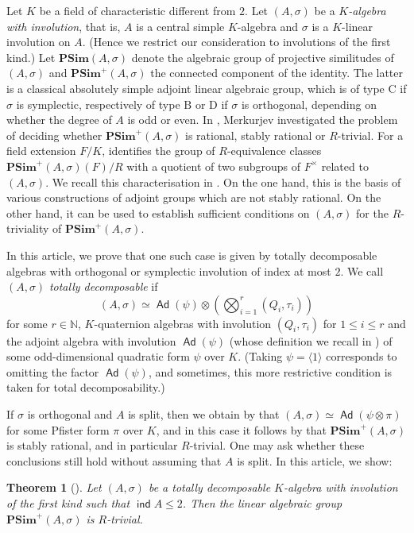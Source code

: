 \documentclass[twoside,11pt]{amsart}
\numberwithin{equation}{section}
\newtheorem*{main}{Theorem}
\theoremstyle{definition}
\newcommand\ind{\operatorname{\mathsf{ind}}}
\newcommand{\mg}[1]{{#1}^{\times}}
\newcommand{\s}{\sigma}
\newcommand{\nat}{\mathbb{N}}
\newcommand{\la}{\langle}
\newcommand{\ra}{\rangle}
\renewcommand{\leq}{\leqslant}
\newcommand\Ad{\operatorname{\mathsf{Ad}}}
\newcommand{\dyn}[1]{\mathrm{#1}}
\begin{document}
Let $K$ be a field of characteristic different from $2$.
Let $(A,\s)$ be a \emph{$K$-algebra with involution}, that is, $A$ is a central simple $K$-algebra and $\s$ is a $K$-linear involution on $A$. (Hence we restrict our consideration to involutions of the first kind.)
Let $\mathbf{PSim}(A,\s)$ denote the algebraic group of  projective similitudes of $(A,\s)$ and $\mathbf{PSim}^+(A,\s)$ the connected component of the identity.
The latter is a classical absolutely simple adjoint linear algebraic group, which is of type $\dyn{C}$ if $\s$ is symplectic, respectively of type $\dyn{B}$ or $\dyn{D}$ if $\s$ is orthogonal, depending on whether the degree of $A$ is odd or even.
In \cite{Mer96}, Merkurjev investigated the problem of deciding whether $\mathbf{PSim}^+(A,\s)$ is rational, stably rational or $R$-trivial. 
For a field extension $F/K$, \cite[Theorem 1]{Mer96} identifies the group of $R$-equivalence classes $\mathbf{PSim}^+(A,\s)(F)/R$ with a quotient of two subgroups of $\mg{F}$ related to $(A,\s)$.
We recall this characterisation in .
On the one hand, this is the basis of various constructions of adjoint groups which are not stably rational.
On the other hand, it can be used to establish sufficient conditions on $(A,\s)$ for the $R$-triviality of $\mathbf{PSim}^+(A,\s)$.

In this article, we prove that one such case is given by totally decomposable algebras with orthogonal or symplectic involution of index at most $2$.
We call $(A,\s)$ \emph{totally decomposable} 
if $$(A,\s)\simeq \Ad(\psi)\otimes\left(\bigotimes_{i=1}^r (Q_i,\tau_i)\right)$$
for some $r\in\nat$, $K$-quaternion algebras with involution $(Q_i,\tau_i)$ for $1\leq i\leq r$ and the adjoint algebra with involution $\Ad(\psi)$ (whose definition we recall in ) of some odd-dimensional quadratic form $\psi$ over $K$. (Taking $\psi=\la 1\ra$ corresponds to omitting the factor $\Ad(\psi)$, and sometimes, this more restrictive condition is taken for total decomposability.)

If $\s$ is orthogonal and $A$ is split, then we obtain by \cite[Theorem 1]{Bec08} that $(A,\s)\simeq \Ad(\psi\otimes \pi)$
for some Pfister form $\pi$ over $K$, and in this case it follows by \cite[Prop.~7]{Mer96} that $\mathbf{PSim}^+(A,\s)$ is stably rational, and in particular $R$-trivial.
One may ask whether these conclusions still hold without assuming that $A$ is split.
In this article, we show:

\begin{main}[]
Let $(A,\sigma)$ be a totally decomposable $K$-algebra with involution of the first kind such that $\ind A\leq 2$. Then the linear algebraic group $\mathbf{PSim}^+(A,\s)$ is $R$-trivial. 
\end{main}
\end{document}
